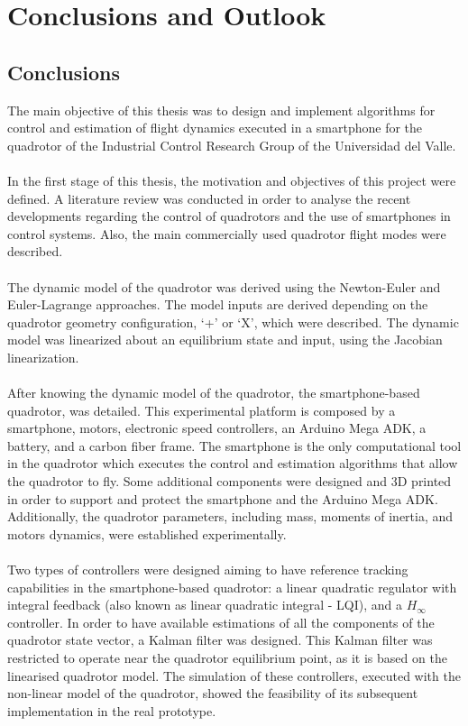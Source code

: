 \chapter{Conclusions and Outlook \label{ch:conclusions}}
\section{Conclusions}
The main objective of this thesis was to design and implement algorithms for control and estimation of flight dynamics executed in a smartphone for the quadrotor of the Industrial Control Research Group of the Universidad del Valle.
\\\\
In the first stage of this thesis, the motivation and objectives of this project were defined. A literature review was conducted in order to analyse the recent developments regarding the control of quadrotors and the use of smartphones in control systems. Also, the main commercially used quadrotor flight modes were described.
\\\\
The dynamic model of the quadrotor was derived using the Newton-Euler and Euler-Lagrange approaches. The model inputs are derived depending on the quadrotor geometry configuration, `+' or `X', which were described. The dynamic model was linearized about an equilibrium state and input, using the Jacobian linearization.
\\\\
After knowing the dynamic model of the quadrotor, the smartphone-based quadrotor, was detailed. This experimental platform is composed by a smartphone, motors, electronic speed controllers, an Arduino Mega ADK, a battery, and a carbon fiber frame. The smartphone is the only computational tool in the quadrotor which executes the control and estimation algorithms that allow the quadrotor to fly. Some additional components were designed and 3D printed in order to support and protect the smartphone and the Arduino Mega ADK. Additionally, the quadrotor parameters, including mass, moments of inertia, and motors dynamics, were established experimentally.
\\\\
Two types of controllers were designed aiming to have reference tracking capabilities in the smartphone-based quadrotor: a linear quadratic regulator with integral feedback (also known as linear quadratic integral - LQI), and a $H_\infty$ controller. In order to have available estimations of all the components of the quadrotor state vector, a Kalman filter was designed. This Kalman filter was restricted to operate near the quadrotor equilibrium point, as it is based on the linearised quadrotor model. The simulation of these controllers, executed with the non-linear model of the quadrotor, showed the feasibility of its subsequent implementation in the real prototype.
